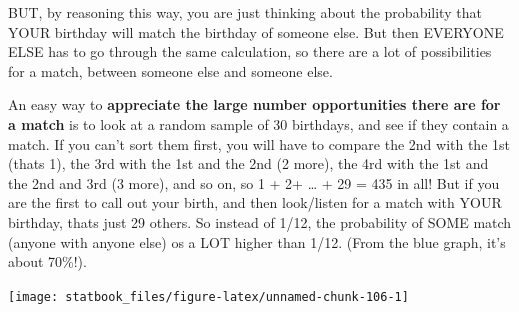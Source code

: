 \documentclass[]{book}
\newenvironment{Shaded}{\begin{snugshade}}{\end{snugshade}}
\newcommand{\CommentTok}[1]{\textcolor[rgb]{0.56,0.35,0.01}{\textit{#1}}}
\newcommand{\DataTypeTok}[1]{\textcolor[rgb]{0.13,0.29,0.53}{#1}}
\newcommand{\DecValTok}[1]{\textcolor[rgb]{0.00,0.00,0.81}{#1}}
\newcommand{\FloatTok}[1]{\textcolor[rgb]{0.00,0.00,0.81}{#1}}
\newcommand{\KeywordTok}[1]{\textcolor[rgb]{0.13,0.29,0.53}{\textbf{#1}}}
\newcommand{\NormalTok}[1]{#1}
\newcommand{\OperatorTok}[1]{\textcolor[rgb]{0.81,0.36,0.00}{\textbf{#1}}}
\newcommand{\OtherTok}[1]{\textcolor[rgb]{0.56,0.35,0.01}{#1}}
\newcommand{\StringTok}[1]{\textcolor[rgb]{0.31,0.60,0.02}{#1}}
\begin{document}
BUT, by reasoning this way, you are just thinking about the probability that YOUR birthday will match the birthday of someone else. But then EVERYONE ELSE has to go through the same calculation, so there are a lot of possibilities for a match, between someone else and someone else.

An easy way to \textbf{appreciate the large number opportunities there are for a match} is to look at a random sample of 30 birthdays, and see if they contain a match. If you can't sort them first, you will have to compare the 2nd with the 1st (thats 1), the 3rd with the 1st and the 2nd (2 more), the 4rd with the 1st and the 2nd and 3rd (3 more), and so on, so 1 + 2+ \ldots{} + 29 = 435 in all! But if you are the first to call out your birth, and then look/listen for a match with YOUR birthday, thats just 29 others. So instead of 1/12, the probability of SOME match (anyone with anyone else) os a LOT higher than 1/12. (From the blue graph, it's about 70\%!).

\begin{Shaded}
\end{Shaded}

\begin{center}\texttt{[image: statbook\_files/figure-latex/unnamed-chunk-106-1]} \end{center}
\end{document}
